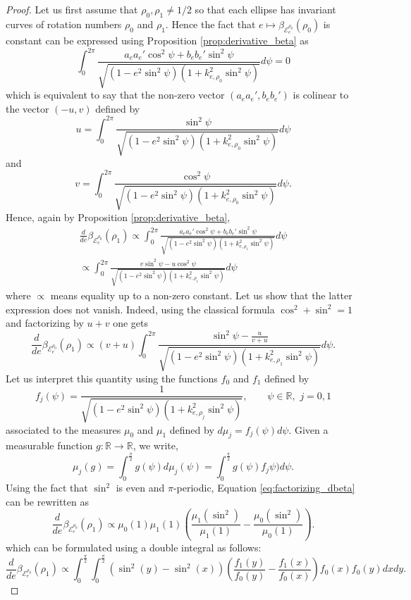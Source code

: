 \documentclass[a4paper]{article}
\theoremstyle{definition}
\def\R{\mathbb{R}}
\begin{document}
\begin{proof}
Let us first assume that $\rho_0,\rho_1\neq 1/2$ so that each ellipse has invariant curves of rotation numbers $\rho_0$ and $\rho_1$. Hence the fact that $e\mapsto\beta_{\mathscr E_e^{\rho_0}}(\rho_0)$ is constant can be expressed using Proposition \ref{prop:derivative_beta} as
\[ 
\int_0^{2\pi}\frac{a_{e}a_{e}'\cos^2\psi+b_{e}b_{e}'\sin^2\psi}{\sqrt{(1-e^2\sin^2\psi)(1+k_{e,\rho_0}^2\sin^2\psi)}}d\psi=0
\]
which is equivalent to say that the non-zero vector $(a_{e}a_{e}',b_{e}b_{e}')$ is colinear to the vector $(-u,v)$ defined by
\[
u = \int_0^{2\pi}\frac{\sin^2\psi}{\sqrt{(1-e^2\sin^2\psi)(1+k_{e,\rho_0}^2\sin^2\psi)}}d\psi
\]
and
\[
v = \int_0^{2\pi}\frac{\cos^2\psi}{\sqrt{(1-e^2\sin^2\psi)(1+k_{e,\rho_0}^2\sin^2\psi)}}d\psi.
\]
Hence, again by Proposition \ref{prop:derivative_beta}, 
\begin{multline*}
\frac{d}{de}\beta_{\mathscr E_e^{\rho_0}}(\rho_1)
\propto
\int_0^{2\pi}\frac{a_{e}a_{e}'\cos^2\psi+b_{e}b_{e}'\sin^2\psi}{\sqrt{(1-e^2\sin^2\psi)(1+k_{e,\rho_1}^2\sin^2\psi)}}d\psi\\
\propto \int_0^{2\pi}\frac{v\sin^2\psi-u\cos^2\psi}{\sqrt{(1-e^2\sin^2\psi)(1+k_{e,\rho_1}^2\sin^2\psi)}}d\psi
\end{multline*}
where $\propto$ means equality up to a non-zero constant. Let us show that the latter expression does not vanish. Indeed, using the classical formula $\cos^2+\sin^2=1$ and factorizing by $u+v$ one gets
\begin{equation}
\label{eq:factorizing_dbeta}
\frac{d}{de}\beta_{\mathscr E_e^{\rho_0}}(\rho_1) 
\propto (v+u)\int_0^{2\pi}\frac{\sin^2\psi-\frac{u}{v+u}}{\sqrt{(1-e^2\sin^2\psi)(1+k_{e,\rho_1}^2\sin^2\psi)}}d\psi.
\end{equation}
Let us interpret this quantity using the functions $f_0$ and $f_1$
 defined by
 \[
 f_j(\psi) = \frac{1}{\sqrt{(1-e^2\sin^2\psi)(1+k_{e,\rho_j}^2\sin^2\psi)}},\qquad \psi\in\R,\,\, j=0,1
 \]
 associated to the measures $\mu_0$ and $\mu_1$ defined by $d\mu_j=f_j(\psi)d\psi$. Given a measurable function $g:\R\to\R$, we write, 
 \[
 \mu_j(g) = \int_0^{\frac{\pi}{2}}g(\psi)d\mu_j(\psi) = \int_0^{\frac{\pi}{2}}g(\psi)f_j\psi)d\psi.
 \]
 Using the fact that $\sin^2$ is even and $\pi$-periodic, Equation \eqref{eq:factorizing_dbeta} can be rewritten as  
 \[
\frac{d}{de}\beta_{\mathscr E_e^{\rho_0}}(\rho_1) 
\propto \mu_0(1)\mu_1(1)\left(
\frac{\mu_1(\sin^2)}{\mu_1(1)}-\frac{\mu_0(\sin^2)}{\mu_0(1)}
\right).
\]
which can be formulated using a double integral as follows:
\[
\frac{d}{de}\beta_{\mathscr E_e^{\rho_0}}(\rho_1) 
\propto
\int_0^{\frac{\pi}{2}}\int_0^{\frac{\pi}{2}}(\sin^2(y)-\sin^2(x))\left(\frac{f_1(y)}{f_0(y)}-\frac{f_1(x)}{f_0(x)}\right)f_0(x)f_0(y)dxdy.
\]
\end{proof}
\end{document}
